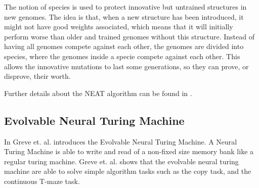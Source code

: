 \newpar The notion of species is used to protect innovative but untrained structures in new genomes. The idea is that, when a new structure has been introduced, it might not have good weights associated, which means that it will initially perform worse than older and trained genomes without this structure. Instead of having all genomes compete against each other, the genomes are divided into species, where the genomes inside a specie compete against each other. This allows the innovative mutations to last some generations, so they can prove, or disprove, their worth.

\newpar Further details about the NEAT algorithm can be found in \cite{stanley2002evolving}.

\subsection{Evolvable Neural Turing Machine}
In \cite{greve2016evolving} Greve et. al. introduces the Evolvable Neural Turing Machine. A Neural Turing Machine is able to write and read of a non-fixed size memory bank like a regular turing machine. Greve et. al. shows that the evolvable neural turing machine are able to solve simple algorithm tasks such as the copy task, and the continuous T-maze task. 
